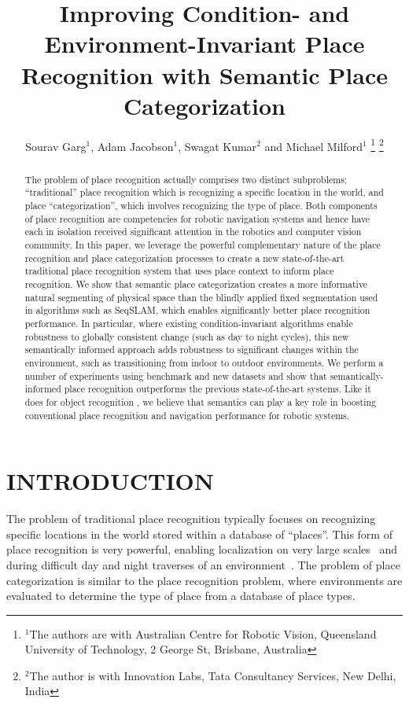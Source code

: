 \documentclass[letterpaper, 10 pt, conference]{ieeeconf}  %
\title{\LARGE \bf
Improving Condition- and Environment-Invariant Place Recognition with Semantic Place Categorization
}
\author{Sourav Garg$^{1}$, Adam Jacobson$^{1}$, Swagat Kumar$^{2}$ and Michael Milford$^{1}$%
\thanks{$^{1}$The authors are with Australian Centre for Robotic Vision,
        Queensland University of Technology,
        2 George St, Brisbane, Australia}%
\thanks{$^{2}$The author is with Innovation Labs, Tata Consultancy Services,
        New Delhi, India}%
}
\begin{document}
\maketitle
\thispagestyle{empty}
\pagestyle{empty}


\begin{abstract}
The problem of place recognition actually comprises two distinct subproblems; ``traditional'' place recognition which is recognizing a specific location in the world, and place ``categorization'', which involves recognizing the type of place. Both components of place recognition are competencies for robotic navigation systems and hence have each in isolation received significant attention in the robotics and computer vision community. In this paper, we leverage the powerful complementary nature of the place recognition and place categorization processes to create a new state-of-the-art traditional place recognition system that uses place context to inform place recognition. We show that semantic place categorization creates a more informative natural segmenting of physical space than the blindly applied fixed segmentation used in algorithms such as SeqSLAM, which enables significantly better place recognition performance. In particular, where existing condition-invariant algorithms enable robustness to globally consistent change (such as day to night cycles), this new semantically informed approach adds robustness to significant changes within the environment, such as transitioning from indoor to outdoor environments. We perform a number of experiments using benchmark and new datasets and show that semantically-informed place recognition outperforms the previous state-of-the-art systems. Like it does for object recognition \cite{sunderhauf2016place}, we believe that  semantics can play a key role in boosting conventional place recognition and navigation performance for robotic systems.
\end{abstract}

\section{INTRODUCTION}


The problem of traditional place recognition typically focuses on recognizing specific locations in the world stored within a database of ``places''. This form of place recognition is very powerful, enabling localization on very large scales~\cite{Cummins2009} and during difficult day and night traverses of an environment~\cite{Milford2012}. The problem of place categorization is similar to the place recognition problem, where environments are evaluated to determine the type of place from a database of place types.
\end{document}
